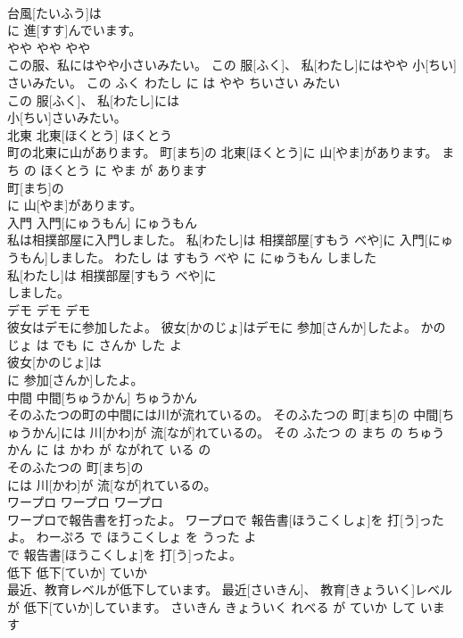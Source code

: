 \documentclass[8pt]{extreport}
\begin{document}
\begin{CJK}{UTF8}{min}
\\	台風[たいふう]は
\\	に 進[すす]んでいます。			
\\	やや	やや	やや	
\\	この服、私にはやや小さいみたい。	この 服[ふく]、 私[わたし]にはやや 小[ちい]さいみたい。	この ふく わたし に は やや ちいさい みたい	
\\	この 服[ふく]、 私[わたし]には
\\	小[ちい]さいみたい。			
\\	北東	北東[ほくとう]	ほくとう	
\\	町の北東に山があります。	町[まち]の 北東[ほくとう]に 山[やま]があります。	まち の ほくとう に やま が あります	
\\	町[まち]の
\\	に 山[やま]があります。			
\\	入門	入門[にゅうもん]	にゅうもん	
\\	私は相撲部屋に入門しました。	私[わたし]は 相撲部屋[すもう べや]に 入門[にゅうもん]しました。	わたし は すもう べや に にゅうもん しました	
\\	私[わたし]は 相撲部屋[すもう べや]に
\\	しました。			
\\	デモ	デモ	デモ	
\\	彼女はデモに参加したよ。	彼女[かのじょ]はデモに 参加[さんか]したよ。	かのじょ は でも に さんか した よ	
\\	彼女[かのじょ]は
\\	に 参加[さんか]したよ。			
\\	中間	中間[ちゅうかん]	ちゅうかん	
\\	そのふたつの町の中間には川が流れているの。	そのふたつの 町[まち]の 中間[ちゅうかん]には 川[かわ]が 流[なが]れているの。	その ふたつ の まち の ちゅうかん に は かわ が ながれて いる の	
\\	そのふたつの 町[まち]の
\\	には 川[かわ]が 流[なが]れているの。			
\\	ワープロ	ワープロ	ワープロ	
\\	ワープロで報告書を打ったよ。	ワープロで 報告書[ほうこくしょ]を 打[う]ったよ。	わーぷろ で ほうこくしょ を うった よ	
\\	で 報告書[ほうこくしょ]を 打[う]ったよ。			
\\	低下	低下[ていか]	ていか	
\\	最近、教育レベルが低下しています。	最近[さいきん]、 教育[きょういく]レベルが 低下[ていか]しています。	さいきん きょういく れべる が ていか して います	

\end{CJK}
\end{document}
